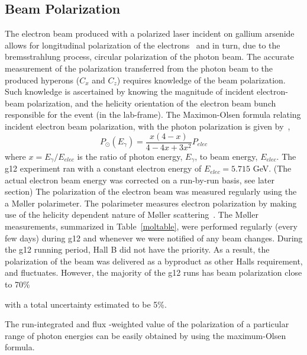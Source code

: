 \subsection{\label{sec:calib.pol}Beam Polarization}
The electron beam produced with a polarized laser incident on gallium arsenide allows for longitudinal polarization of the electrons~\cite{polarizedelectronsnew} and in turn, due to the bremsstrahlung process, circular polarization of the photon beam.  The accurate measurement of the polarization transferred from the photon beam to the produced hyperons ($C_x$ and $C_z$) requires knowledge of the beam polarization.  Such knowledge is ascertained by knowing the magnitude of incident electron-beam polarization, and the helicity orientation of the electron beam bunch responsible for the event (in the lab-frame). The Maximon-Olsen formula relating incident electron beam polarization, with the photon polarization is given by~\cite{MaximonOlsen},
\begin{equation}
P_\odot(E_\gamma) = \frac{x(4-x)}{4 - 4x + 3x^2}P_{elec}
\end{equation}
where $x = E_\gamma /E_{elec}$ is the ratio of photon energy, $E_\gamma$, to beam energy, $E_{elec}$. The g12 experiment ran with a constant electron energy of $E_{elec} = 5.715$ GeV.  (The actual electron beam energy was corrected on a run-by-run basis, see later section) The polarization of the electron beam was measured regularly using the a M{\o}ller polarimeter.  The polarimeter measures electron polarization by making use of the helicity dependent nature of M{\o}ller scattering~\cite{Mecking,Carman}. The M{\o}ller measurements, summarized in Table~\ref{moltable}, were performed regularly (every few days) during g12 and whenever we were notified of any beam changes. During the g12 running period, Hall B did not have the priority. As a result, the polarization of the beam was delivered as a byproduct as other Halls requirement, and fluctuates. However, the majority of the g12 runs has beam polarization close to 70\% \begin{v2}with a total uncertainty estimated to be 5\%. \end{v2} The run-integrated and flux -weighted value of the polarization of a particular range of photon energies can be easily obtained by using the maximum-Olsen formula.

